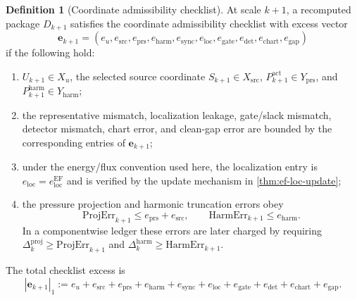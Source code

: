 \documentclass[11pt]{article}
\numberwithin{equation}{section}
\theoremstyle{plain}
\theoremstyle{definition}
\newtheorem{definition}[theorem]{Definition}
\theoremstyle{remark}
\newcommand{\prs}{\mathrm{prs}}
\newcommand{\harm}{\mathrm{harm}}
\newcommand{\proj}{\mathrm{proj}}
\newcommand{\sync}{\mathrm{sync}}
\newcommand{\gate}{\mathrm{gate}}
\newcommand{\detc}{\mathrm{det}}
\newcommand{\locerr}{\mathrm{loc}}
\newcommand{\gap}{\mathrm{gap}}
\begin{document}
\begin{definition}[Coordinate admissibility checklist]\label{def:coord-check}
At scale \(k+1\), a recomputed package \(D_{k+1}\) satisfies the coordinate
admissibility checklist with excess vector
\[
  \mathbf e_{k+1}
  =
  (e_u,e_{\mathrm{src}},e_{\prs},e_{\harm},
  e_{\sync},e_{\locerr},e_{\gate},e_{\detc},e_{\mathrm{chart}},e_{\gap})
\]
if the following hold:
\begin{enumerate}[label=(\alph*)]
  \item \(U_{k+1}\in X_u\), the selected source coordinate
  \(S_{k+1}\in X_{\mathrm{src}}\),
  \(P_{k+1}^{\mathrm{act}}\in Y_{\prs}\), and
  \(P_{k+1}^{\harm}\in Y_{\harm}\);
  \item the representative mismatch, localization leakage, gate/slack
  mismatch, detector mismatch, chart error, and clean-gap error are bounded
  by the corresponding entries of \(\mathbf e_{k+1}\);
  \item under the energy/flux convention used here, the
  localization entry is \(e_{\locerr}=e_{\locerr}^{\mathrm{EF}}\) and is
  verified by the update mechanism in \cref{thm:ef-loc-update};
  \item the pressure projection and harmonic truncation errors obey
  \[
    \mathrm{ProjErr}_{k+1}\le e_{\prs}+e_{\mathrm{src}},
    \qquad
    \mathrm{HarmErr}_{k+1}\le e_{\harm}.
  \]
  In a componentwise ledger these errors are later charged by requiring
  \(\Delta_k^{\proj}\ge\mathrm{ProjErr}_{k+1}\) and
  \(\Delta_k^{\harm}\ge\mathrm{HarmErr}_{k+1}\).
\end{enumerate}
The total checklist excess is
\[
  |\mathbf e_{k+1}|_1
  :=
  e_u+e_{\mathrm{src}}+e_{\prs}+e_{\harm}
  +e_{\sync}+e_{\locerr}+e_{\gate}+e_{\detc}
  +e_{\mathrm{chart}}+e_{\gap}.
\]
\end{definition}
\end{document}
